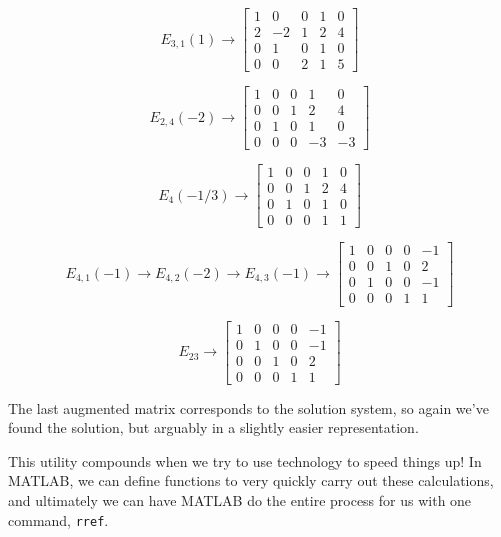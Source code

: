\documentclass{ximera}
\begin{document}
 $$E_{3,1}(1)\rightarrow%
\left[\begin{array}{cccc|c} 
 1&0&0&1&0\\2&-2&1&2&4\\0&1&0&1&0\\0&0&2&1&5
 \end{array}\right]$$

$$E_{2,4}(-2)\rightarrow%
\left[\begin{array}{cccc|c} 
 1&0&0&1&0\\0&0&1&2&4\\0&1&0&1&0\\0&0&0&-3&-3
 \end{array}\right]$$

$$E_4(-1/3)\rightarrow%
 \left[\begin{array}{cccc|c} 
 1&0&0&1&0\\0&0&1&2&4\\0&1&0&1&0\\0&0&0&1&1
 \end{array}\right]$$

$$E_{4,1}(-1)\rightarrow%
E_{4,2}(-2)\rightarrow%
E_{4,3}(-1)\rightarrow%
\left[\begin{array}{cccc|c} 
 1&0&0&0&-1\\0&0&1&0&2\\0&1&0&0&-1\\0&0&0&1&1
 \end{array}\right]$$

 $$E_{23}\rightarrow%
 \left[\begin{array}{cccc|c}
  1&0&0&0&-1\\
  0&1&0&0&-1\\
  0&0&1&0&2\\
  0&0&0&1&1
\end{array}\right]$$ 


  
The last augmented matrix corresponds to the solution system, so again we've found the solution, but arguably in a slightly easier representation.

This utility compounds when we try to use technology to speed things up! In MATLAB, we can define functions to very quickly carry out these calculations, and ultimately we can have MATLAB do the entire process for us with one command, \texttt{rref}.
\end{document}
